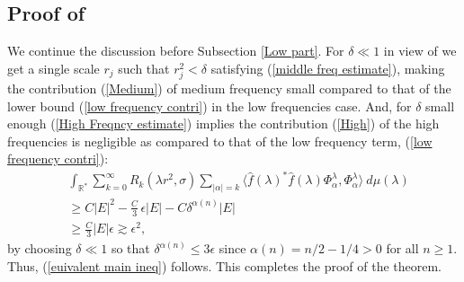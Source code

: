 \documentclass[11pt, reqno]{amsart}
\theoremstyle{plain}
\newcommand{\R}{\ensuremath{\mathbb{R_+}}}
\theoremstyle{remark}
\theoremstyle{example}
\theoremstyle{definition}
\numberwithin{equation}{section}
\def\R{\mathbb{R}}
\begin{document}
\subsection{Proof of } We continue the discussion before Subsection \ref{Low part}. For $\delta \ll 1$ in view of  we get a single scale $r_{j}$ such that $r_{j}^2 < \delta$ satisfying (\ref{middle freq estimate}), making the contribution (\ref{Medium}) of medium frequency small compared to that of  the lower bound  (\ref{low frequency contri}) in the low frequencies case. And, for $\delta$ small enough (\ref{High Freqncy estimate}) implies the contribution (\ref{High}) of the high frequencies is negligible as compared to that of the low frequency term, (\ref{low frequency contri}):
\begin{equation*}
    \begin{split}
        & \int_{\R^{*}} \sum_{k=0}^{\infty} R_{k}(\lambda r^{2},\sigma) \sum_{|\alpha|=k} \langle \hat{f}(\lambda)^{*} \hat{f}(\lambda) \Phi_{\alpha}^{\lambda},\Phi_{\alpha}^{\lambda} \rangle \ d\mu(\lambda) \\
        & \geq C |E|^2 - {\textstyle\frac{C}{3} } \, \epsilon |E| - C \delta^{\alpha(n)} |E|\\
        & \geq \frac{C}{3}|E| \epsilon \gtrsim \epsilon^2,
    \end{split}
\end{equation*}
by choosing $\delta \ll 1$ so that $\delta^{\alpha(n)} \leq 3 \epsilon$ since $\alpha(n)= n/2 - 1/4>0$ for all $n \geq 1$.  Thus, (\ref{euivalent main ineq}) follows. This completes the proof of the theorem.
\end{document}

